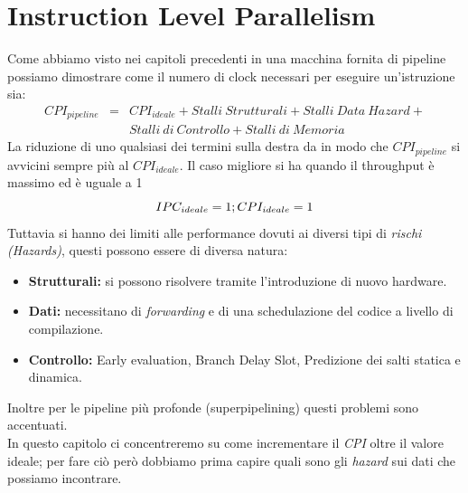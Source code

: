 \section{Instruction Level Parallelism}\label{capitolo3}
Come abbiamo visto nei capitoli precedenti in una macchina fornita di pipeline possiamo dimostrare come il numero di clock necessari per eseguire un'istruzione sia:
$$\begin{array}{rcl}
CPI_{pipeline} & = & CPI_{ideale}+ Stalli \ Strutturali + Stalli \ Data \ Hazard + \\
&& Stalli \ di \ Controllo + Stalli \ di \ Memoria
\end{array}$$
La riduzione di uno qualsiasi dei termini sulla destra da in modo che $CPI_{pipeline}$ si avvicini sempre più al $CPI_{ideale}$. Il caso migliore si ha quando il throughput è massimo ed è uguale a 1
$$IPC_{ideale} = 1; \\ CPI_{ideale} = 1$$
Tuttavia si hanno dei limiti alle performance dovuti ai diversi tipi di \emph{rischi (Hazards)}, questi possono essere di diversa natura:
\begin{itemize}
\item \textbf{Strutturali:} si possono risolvere tramite l'introduzione di nuovo hardware.
\item \textbf{Dati:} necessitano di \emph{forwarding} e di una schedulazione del codice a livello di compilazione.
\item \textbf{Controllo:} Early evaluation, Branch Delay Slot, Predizione dei salti statica e dinamica.
\end{itemize}
Inoltre per le pipeline più profonde (superpipelining) questi problemi sono accentuati.\\
In questo capitolo ci concentreremo su come incrementare il \emph{CPI} oltre il valore ideale; per fare ciò però dobbiamo prima capire quali sono gli \emph{hazard} sui dati che possiamo incontrare.
